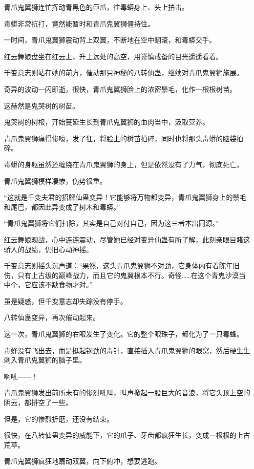 \begin{this_body}
青爪鬼翼狮连忙挥动青黑色的巨爪，往毒蟒身上、头上拍击。

毒蟒非常抗打，竟然能暂时和青爪鬼翼狮僵持住。

一时间，青爪鬼翼狮震动背上双翼，不断地在空中翻滚，和毒蟒交手。

红云舞娘盘坐在红云上，升上远处的高空，用谨慎戒备的目光遥遥看着。

千变意志则站在她的前方，催动那只神秘的八转仙蛊，继续对青爪鬼翼狮施展。

奇异的波动一闪即逝，很快，青爪鬼翼狮脸上的浓密鬃毛，化作一根根树苗。

这赫然是鬼哭树的树苗。

鬼哭树的树根，开始蔓延生长到青爪鬼翼狮的血肉当中，汲取营养。

青爪鬼翼狮痛得惨嚎，发了狂，将脸上的树苗拍碎，同时也将那头毒蟒的脑袋拍碎。

毒蟒的身躯虽然还缠绕在青爪鬼翼狮的身上，但是依然没有了力气，彻底死亡。

青爪鬼翼狮模样凄惨，伤势很重。

“这就是千变夫君的招牌仙蛊变异！它能够将万物都变异，青爪鬼翼狮身上的鬃毛和尾巴，都因此异变成了树木和毒蟒。”

“青爪鬼翼狮将它们扫除，其实是自己对付自己，因为这三者本出同源。”

红云舞娘观战，心中连连震动，尽管她已经对变异仙蛊有所了解，此刻亲眼目睹这骄人的战绩，仍旧心动神摇。

千变意志则摇头沉声道：“果然，这头青爪鬼翼狮不对劲，它身体内有着陈年旧伤，只有上古级的巅峰战力，而且它的鬼翼根本不行。奇怪……在这个青鬼沙漠当中个，它应该不缺食物才对。”

虽是疑惑，但千变意志却失踪没有停手。

八转仙蛊变异，再次催动起来。

这一次，青爪鬼翼狮的右眼发生了变化。它的整个眼珠子，都化为了一只毒蜂。

毒蜂没有飞出去，而是挺起钢劲的毒针，直接插入青爪鬼翼狮的眼窝，然后硬生生刺入青爪鬼翼狮的脑子里。

啊吼——！

青爪鬼翼狮发出前所未有的惨烈吼叫，叫声掀起一股巨大的音浪，将它头顶上空的阴云，都排空了一些。

但是，它的惨烈折磨，还没有结束。

很快，在八转仙蛊变异的威能下，它的爪子、牙齿都疯狂生长，变成一根根的上古荒草。

青爪鬼翼狮疯狂地扇动双翼，向下俯冲，想要逃跑。


\end{this_body}
